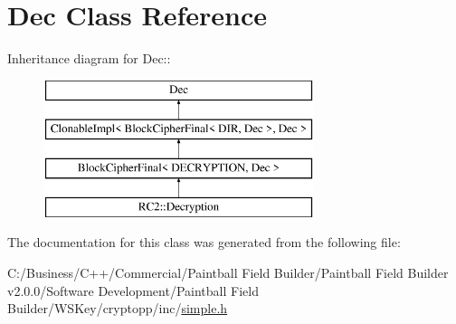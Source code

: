 \hypertarget{class_dec}{
\section{Dec Class Reference}
\label{class_dec}
}
Inheritance diagram for Dec::\begin{figure}[H]
\begin{center}
\leavevmode
\includegraphics[height=4cm]{class_dec}
\end{center}
\end{figure}


The documentation for this class was generated from the following file:\begin{DoxyCompactItemize}
\item 
C:/Business/C++/Commercial/Paintball Field Builder/Paintball Field Builder v2.0.0/Software Development/Paintball Field Builder/WSKey/cryptopp/inc/\hyperlink{simple_8h}{simple.h}\end{DoxyCompactItemize}
